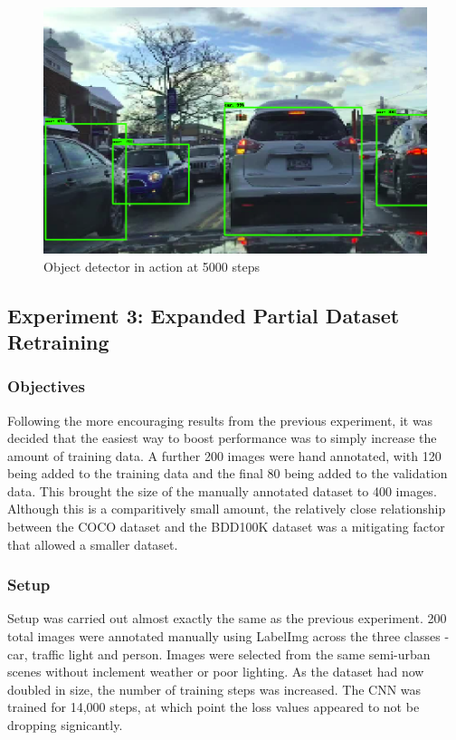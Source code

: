 \documentclass[12pt]{report}
\begin{document}
\vspace{0.5cm}
\begin{figure}[ht!]
	\centering
	\includegraphics[width=15cm]{classes-smalldata-5k}
	\caption{Object detector in action at 5000 steps}
	\label{fig:class-smalldata-5k}
\end{figure}

\clearpage
\subsection{Experiment 3: Expanded Partial Dataset Retraining}
\subsubsection{Objectives}
\begin{flushleft}
Following the more encouraging results from the previous experiment, it was decided that the easiest way to boost performance was to simply increase the amount of training data. A further 200 images were hand annotated, with 120 being added to the training data and the final 80 being added to the validation data. This brought the size of the manually annotated dataset to 400 images. Although this is a comparitively small amount, the relatively close relationship between the COCO dataset and the BDD100K dataset was a mitigating factor that allowed a smaller dataset.
\end{flushleft}

\subsubsection{Setup}
\begin{flushleft}
Setup was carried out almost exactly the same as the previous experiment. 200 total images were annotated manually using LabelImg across the three classes - car, traffic light and person. Images were selected from the same semi-urban scenes without inclement weather or poor lighting. As the dataset had now doubled in size, the number of training steps was increased. The CNN was trained for 14,000 steps, at which point the loss values appeared to not be dropping signicantly.
\end{flushleft}
\end{document}
